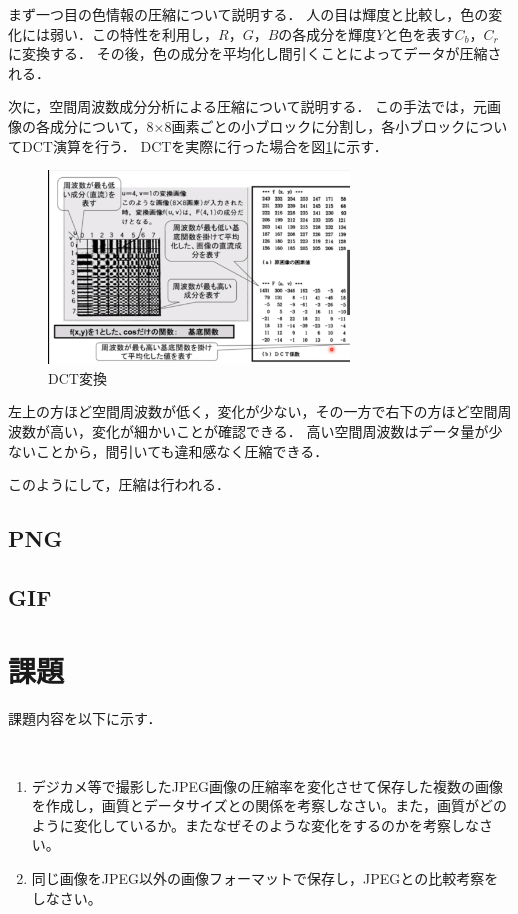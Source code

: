 \documentclass[a4paper,11pt]{bxjsarticle}
\begin{document}
まず一つ目の色情報の圧縮について説明する．
人の目は輝度と比較し，色の変化には弱い．この特性を利用し，$R$，$G$，$B$の各成分を輝度$Y$と色を表す$C_b$，$C_r$に変換する．
その後，色の成分を平均化し間引くことによってデータが圧縮される．

次に，空間周波数成分分析による圧縮について説明する．
この手法では，元画像の各成分について，8×8画素ごとの小ブロックに分割し，各小ブロックについてDCT演算を行う．
DCTを実際に行った場合を図\ref{fig:dct}に示す．

\begin{figure}[htbp]
  \centering  %
  \includegraphics[clip,width = 8.0cm]{dct_con.eps}
  \caption{DCT変換}
  \label{fig:dct}
  \end{figure}

左上の方ほど空間周波数が低く，変化が少ない，その一方で右下の方ほど空間周波数が高い，変化が細かいことが確認できる．
高い空間周波数はデータ量が少ないことから，間引いても違和感なく圧縮できる．

このようにして，圧縮は行われる．

\subsection{PNG}
 
\subsection{GIF}

\section{課題}
課題内容を以下に示す．

　\begin{enumerate}
    \item デジカメ等で撮影したJPEG画像の圧縮率を変化させて保存した複数の画像を作成し，画質とデータサイズとの関係を考察しなさい。また，画質がどのように変化しているか。またなぜそのような変化をするのかを考察しなさい。
    \item 同じ画像をJPEG以外の画像フォーマットで保存し，JPEGとの比較考察をしなさい。
  \end{enumerate}
\end{document}
